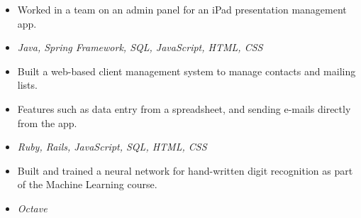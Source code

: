 

\begin{itemize}
    \item Worked in a team on an admin panel for an iPad presentation management app.
    \item \textit{Java, Spring Framework, SQL, JavaScript, HTML, CSS}
\end{itemize}
\begin{itemize}
    \item Built a web-based client management system to manage contacts and mailing lists.
    \item Features such as data entry from a spreadsheet, and sending e-mails directly from the app. 
    \item \textit{Ruby, Rails, JavaScript, SQL, HTML, CSS}
\end{itemize}
\begin{itemize}
    \item Built and trained a neural network for hand-written digit recognition as part of the Machine Learning course.
    \item \textit{Octave}
\end{itemize}


\divider

\divider

    

